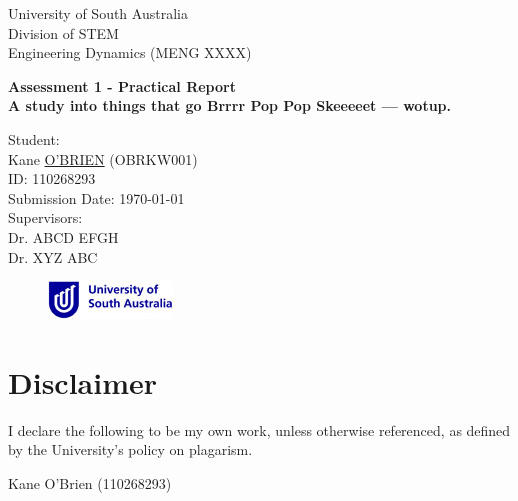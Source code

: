 \begin{titlepage}
\centering
{\Large University of South Australia\\Division of STEM\\[1\baselineskip]}
{\Huge Engineering Dynamics (MENG XXXX)\\}
{\Huge \textbf{Assessment 1 - Practical Report} \\[4\baselineskip]\vfill
{\Huge \textbf{A study into things that go Brrrr Pop Pop Skeeeeet --- wotup.}}
\par\vfill
{\Large Student:\\}
{\Large Kane \underline{O'BRIEN} (OBRKW001)\\ID: 110268293\\}
\vspace*{4\baselineskip}
{\Large Submission Date: \today \\}
\vspace*{\baselineskip}
{\large Supervisors:\\}
{\Large Dr. ABCD EFGH\\ \vspace{1mm} Dr. XYZ ABC}
\begin{figure}[b]\raggedleft \includegraphics{images/UniSAlogo}\end{figure}}
\end{titlepage}
\clearpage
\section*{Disclaimer}
\setlength{\baselineskip}{1.5em}
I declare the following to be my own work, unless otherwise referenced, as defined by the University's policy on plagarism.
\begin{flushright}Kane O'Brien (110268293)\\\vspace*{\baselineskip}\end{flushright}
\clearpage
